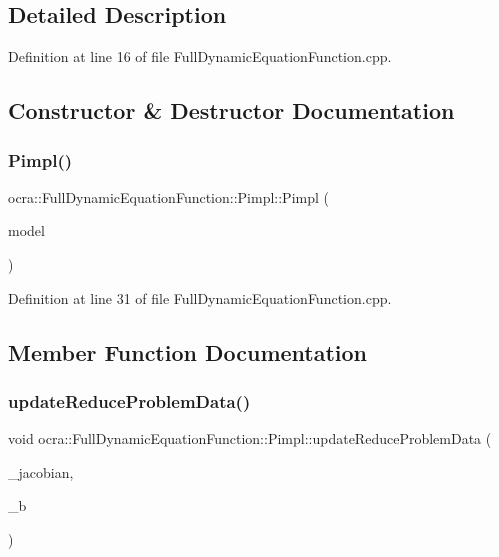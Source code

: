 \subsection{Detailed Description}


Definition at line 16 of file Full\+Dynamic\+Equation\+Function.\+cpp.



\subsection{Constructor \& Destructor Documentation}
\hypertarget{structFullDynamicEquationFunction_1_1Pimpl_acc3b35606d52aa163f27d80f49cb3aaf}{}\label{structFullDynamicEquationFunction_1_1Pimpl_acc3b35606d52aa163f27d80f49cb3aaf} 
\subsubsection{\texorpdfstring{Pimpl()}{Pimpl()}}
{\footnotesize\ttfamily ocra\+::\+Full\+Dynamic\+Equation\+Function\+::\+Pimpl\+::\+Pimpl (\begin{DoxyParamCaption}\item[{const Model \&}]{model }\end{DoxyParamCaption})\hspace{0.3cm}{\ttfamily [inline]}}



Definition at line 31 of file Full\+Dynamic\+Equation\+Function.\+cpp.



\subsection{Member Function Documentation}
\hypertarget{structFullDynamicEquationFunction_1_1Pimpl_a4d1df4cadec603942aeb750212a2d258}{}\label{structFullDynamicEquationFunction_1_1Pimpl_a4d1df4cadec603942aeb750212a2d258} 
\subsubsection{\texorpdfstring{update\+Reduce\+Problem\+Data()}{updateReduceProblemData()}}
{\footnotesize\ttfamily void ocra\+::\+Full\+Dynamic\+Equation\+Function\+::\+Pimpl\+::update\+Reduce\+Problem\+Data (\begin{DoxyParamCaption}\item[{const Eigen\+::\+Matrix\+Xd \&}]{\+\_\+jacobian,  }\item[{const Eigen\+::\+Vector\+Xd \&}]{\+\_\+b }\end{DoxyParamCaption})\hspace{0.3cm}{\ttfamily [inline]}}



